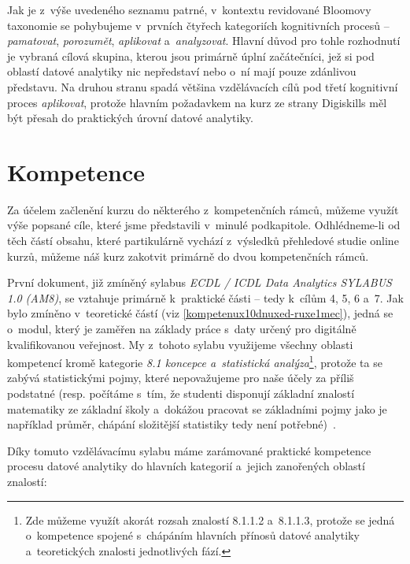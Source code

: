 Jak je z~výše uvedeného seznamu patrné, v~kontextu revidované Bloomovy taxonomie se pohybujeme v~prvních čtyřech kategoriích kognitivních procesů -- \emph{pamatovat}, \emph{porozumět}, \emph{aplikovat} a~\emph{analyzovat}. Hlavní důvod pro tohle rozhodnutí je vybraná cílová skupina, kterou jsou primárně úplní začátečníci, jež si pod oblastí datové analytiky nic nepředstaví nebo o~ní mají pouze zdánlivou představu. Na druhou stranu spadá většina vzdělávacích cílů pod třetí kognitivní proces \emph{aplikovat}, protože hlavním požadavkem na kurz ze strany Digiskills měl být přesah do praktických úrovní datové analytiky.

\hypertarget{kompetence}{%
\section{Kompetence}\label{kompetence}}

Za účelem začlenění kurzu do některého z~kompetenčních rámců, můžeme využít výše popsané cíle, které jsme představili v~minulé podkapitole. Odhlédneme-li od těch částí obsahu, které partikulárně vychází z~výsledků přehledové studie online kurzů, můžeme náš kurz zakotvit primárně do dvou kompetenčních rámců.

První dokument, již zmíněný sylabus \emph{ECDL / ICDL Data Analytics SYLABUS 1.0 (AM8)}, se vztahuje primárně k~praktické části -- tedy k~cílům 4, 5, 6 a~7. Jak bylo zmíněno v~teoretické částí (viz \ref{kompetenux10dnuxed-ruxe1mec}), jedná se o~modul, který je zaměřen na základy práce s~daty určený pro digitálně kvalifikovanou veřejnost. My z~tohoto sylabu využijeme všechny oblasti kompetencí kromě kategorie \emph{8.1 koncepce a~statistická analýza}\footnote{Zde můžeme využít akorát rozsah znalostí 8.1.1.2 a~8.1.1.3, protože se jedná o~kompetence spojené s~chápáním hlavních přínosů datové analytiky a~teoretických znalosti jednotlivých fází.}, protože ta se zabývá statistickými pojmy, které nepovažujeme pro naše účely za příliš podstatné (resp. počítáme s~tím, že studenti disponují základní znalostí matematiky ze základní školy a~dokážou pracovat se základními pojmy jako je například průměr, chápání složitější statistiky tedy není potřebné)~\parencite{ecdl17}.

Díky tomuto vzdělávacímu sylabu máme zarámované praktické kompetence procesu datové analytiky do hlavních kategorií a~jejich zanořených oblastí znalostí:

